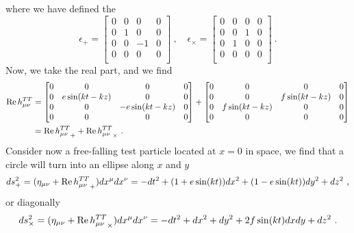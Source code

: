     where we have defined the 
    \begin{equation*}
        \epsilon_+ = \begin{bmatrix}
            0 & 0 & 0 & 0 \\
            0 & 1 & 0 & 0 \\
            0 & 0 & -1 & 0 \\
            0 & 0 & 0 & 0 \\
        \end{bmatrix} ~, \quad \epsilon_\times = \begin{bmatrix}
            0 & 0 & 0 & 0 \\
            0 & 0 & 1 & 0 \\
            0 & 1 & 0 & 0 \\
            0 & 0 & 0 & 0 \\
        \end{bmatrix} ~.
    \end{equation*}
    Now, we take the real part, and we find 
    \begin{equation*}
    \begin{aligned}
        \operatorname{Re} h^{TT}_{\mu\nu} & = \begin{bmatrix}
            0 & 0 & 0 & 0 \\
            0 & e \sin(kt - k z) & 0 & 0 \\
            0 & 0 & - e \sin(k t - k z) & 0 \\
            0 & 0 & 0 & 0 \\
        \end{bmatrix} + \begin{bmatrix}
            0 & 0 & 0 & 0 \\
            0 & 0 & f \sin(k t- k z) & 0 \\
            0 & f \sin(k t - k z) & 0 & 0 \\
            0 & 0 & 0 & 0 \\
        \end{bmatrix} \\ & = \operatorname{Re} {h^{TT}_{\mu\nu}}_+ + \operatorname{Re} {h^{TT}_{\mu\nu}}_\times ~.
    \end{aligned}
    \end{equation*}
    Consider now a free-falling test particle located at $x=0$ in space, we find that a circle will turn into an ellipse along $x$ and $y$
    \begin{equation*}
    \begin{aligned}
        ds^2_+ = (\eta_{\mu\nu} + \operatorname{Re} {h^{TT}_{\mu\nu}}_+) dx^\mu dx^\nu = - dt^2 + (1 + e \sin(kt)) dx^2 + (1-e \sin(kt)) dy^2 + dz^2 ~,
    \end{aligned}
    \end{equation*}
    or diagonally
    \begin{equation*}
    \begin{aligned}
        ds^2_\times = (\eta_{\mu\nu} + \operatorname{Re} {h^{TT}_{\mu\nu}}_\times) dx^\mu dx^\nu = - dt^2 + dx^2 + dy^2 + 2 f \sin(kt) dxdy + dz^2 ~.
    \end{aligned}
    \end{equation*}

